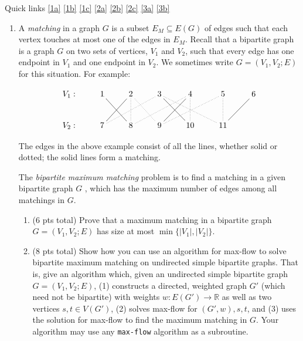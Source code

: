 \documentclass[12pt]{article}
\begin{document}
\renewcommand{\headrulewidth}{0.5pt}
\phantom{Test}

Quick links \ref{1a} \ref{1b} \ref{1c} \ref{2a} \ref{2b} \ref{2c} \ref{3a} \ref{3b}

\vspace{-3mm}
\begin{enumerate}

\item A \emph{matching} in a graph $G$ is a subset $E_M
    \subseteq E(G)$ of edges such that each vertex touches at most one of the
        edges in $E_M$. Recall that a bipartite graph is a graph $G$ on two
        sets of vertices, $V_1$ and $V_2$, such that every edge has one
        endpoint in $V_1$ and one endpoint in $V_2$. We sometimes write $G =
        (V_1, V_2; E)$ for this situation. For example:
	
	\[
\xymatrix{
V_1: & 1 \cir{}  \ar@{-}[dr] & 2 \ar@{-}[dl] \ar@{.}[d] \ar@{.}[dr] & 3 \ar@{.}[dll] \ar@{-}[dr]\ar@{.}[drr]  & 4 \ar@{.}[dll] \ar@{-}[dl] \ar@{.}[d] & 5 \ar@{.}[dll]  \ar@{.}[d]  & 6 \ar@{-}[dl] \\
V_2: & 7 & 8 & 9  & 10 & 11 
}
\]

The edges in the above example consist of all the lines, whether solid or dotted; the solid lines form a matching. 

The \emph{bipartite maximum matching} problem is to find a matching in a given bipartite graph $G$ , which has the maximum number of edges among all matchings in $G$.
\pagebreak

\begin{enumerate}
    \item (6 pts total)  \label{1a} Prove that a maximum matching in a bipartite graph $G = (V_1, V_2; E)$ has size at most $\min\{|V_1|, |V_2|\}$.
\pagebreak

\item (8 pts total) \label{1b} Show how you can use an algorithm for max-flow to solve bipartite maximum
    matching on undirected simple bipartite graphs. That is, give an algorithm
        which, given an undirected simple bipartite graph $G = (V_1, V_2; E)$,
        (1) constructs a directed, weighted graph $G'$ (which need not be
        bipartite) with weights $w:E(G') \to \mathbb{R}$ as well as two
        vertices $s,t \in V(G')$, (2) solves max-flow for $(G', w),s,t$, and
        (3) uses the solution for max-flow to find the maximum matching in $G$.
        Your algorithm may use any \texttt{max-flow} algorithm as a subroutine.
\pagebreak


\end{enumerate}
\end{enumerate}
\end{document}
